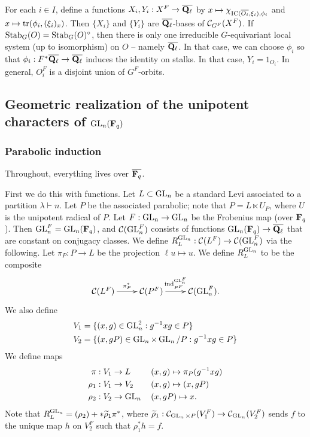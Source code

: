 For each $i\in I$, define a functions $X_i,Y_i:X^F \to \overline{\mathbf{Q}_\ell}$ by 
$x\mapsto \chi_{\operatorname{IC}(\overline{O_i},\xi_i),\phi_i}$ and
$x\mapsto \operatorname{tr}(\phi_i,(\xi_i)_x)$. Then 
$\{X_i\}$ and $\{Y_i\}$ are $\overline{\mathbf{Q}_\ell}$-bases of $\mathcal{C}_{G^F}(X^F)$. 
If $\operatorname{Stab}_G(O)=\operatorname{Stab}_G(O)^\circ$, then there is only one irreducible 
$G$-equivariant local system (up to isomorphism) on $O$ -- namely 
$\overline{\mathbf{Q}_\ell}$. In that case, we can choose $\phi_i$ so that 
$\phi_i:F^\ast \overline{\mathbf{Q}_\ell}\to \overline{\mathbf{Q}_\ell}$ induces the identity 
on stalks. In that case, $Y_i=1_{O_i}$. In general, 
$O_i^F$ is a disjoint union of $G^F$-orbits. 





\subsection{Geometric realization of the unipotent characters of \texorpdfstring{$\operatorname{GL}_n(\mathbf{F}_q)$}{GLnFq}}


\subsubsection{Parabolic induction}

Throughout, everything lives over $\overline{\mathbf{F}_q}$. 

First we do this with functions. Let $L\subset \operatorname{GL}_n$ be a 
standard Levi associated to a partition $\lambda\vdash n$. Let $P$ 
be the associated parabolic; note that $P=L\ltimes U_P$, where 
$U$ is the unipotent radical of $P$. Let 
$F:\operatorname{GL}_n \to \operatorname{GL}_n$ be the Frobenius map (over 
$\mathbf{F}_q$). Then $\operatorname{GL}_n^F = \operatorname{GL}_n(\mathbf{F}_q)$, and 
$\mathcal{C}(\operatorname{GL}_n^F)$ consists of functions 
$\operatorname{GL}_n(\mathbf{F}_q) \to \overline{\mathbf{Q}_\ell}$ that are constant 
on conjugacy classes. We define 
$R_L^{\operatorname{GL}_n}:\mathcal{C}(L^F) \to \mathcal{C}(\operatorname{GL}_n^F)$ via 
the following. Let $\pi_P:P \to L$ be the projection 
$\ell u\mapsto u$. We define 
$R_L^{\operatorname{GL}_n}$ to be the composite 
\[\xymatrix{
  \cC(L^F) \ar[r]^-{\pi_P^\ast} 
    & \cC(P^F) \ar[r]^-{\induce_{P^F}^{\generallinear_n^F}} 
    & \cC(\generallinear_n^F) .
}\]
We also define 
\begin{align*}
  V_1 &= \{(x,g)\in \operatorname{GL}_n^2:g^{-1} x g\in P\} \\
  V_2 &= \{(x,g P)\in \operatorname{GL}_n\times \operatorname{GL}_n / P:g^{-1} x g\in P\} 
\end{align*}
We define maps 
\begin{align*}
  \pi:V_1 &\to L && (x,g)\mapsto \pi_P(g^{-1} x g) \\
  \rho_1:V_1 &\to V_2 && (x,g) \mapsto (x, g P) \\
  \rho_2:V_2 &\to \operatorname{GL}_n{} && (x, g P)\mapsto x .
\end{align*}
Note that $R_L^{\operatorname{GL}_n} = (\rho_2)+\ast \widetilde \rho_1 \pi^\ast$, 
where 
$\widetilde \rho_1:\mathcal{C}_{\operatorname{GL}_n\times P}(V_1^F) \to \mathcal{C}_{\operatorname{GL}_n}(V_2^F)$ 
sends $f$ to the unique map $h$ on $V_2^F$ such that 
$\rho_1^\ast h = f$. 

